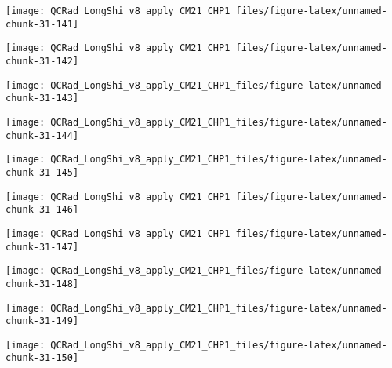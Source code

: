 \documentclass[
  10pt,
  a4paper,oneside]{article}
\begin{document}
\begin{center}\texttt{[image: QCRad\_LongShi\_v8\_apply\_CM21\_CHP1\_files/figure-latex/unnamed-chunk-31-141]} \end{center}

\begin{center}\texttt{[image: QCRad\_LongShi\_v8\_apply\_CM21\_CHP1\_files/figure-latex/unnamed-chunk-31-142]} \end{center}

\begin{center}\texttt{[image: QCRad\_LongShi\_v8\_apply\_CM21\_CHP1\_files/figure-latex/unnamed-chunk-31-143]} \end{center}

\begin{center}\texttt{[image: QCRad\_LongShi\_v8\_apply\_CM21\_CHP1\_files/figure-latex/unnamed-chunk-31-144]} \end{center}

\begin{center}\texttt{[image: QCRad\_LongShi\_v8\_apply\_CM21\_CHP1\_files/figure-latex/unnamed-chunk-31-145]} \end{center}

\begin{center}\texttt{[image: QCRad\_LongShi\_v8\_apply\_CM21\_CHP1\_files/figure-latex/unnamed-chunk-31-146]} \end{center}

\begin{center}\texttt{[image: QCRad\_LongShi\_v8\_apply\_CM21\_CHP1\_files/figure-latex/unnamed-chunk-31-147]} \end{center}

\begin{center}\texttt{[image: QCRad\_LongShi\_v8\_apply\_CM21\_CHP1\_files/figure-latex/unnamed-chunk-31-148]} \end{center}

\begin{center}\texttt{[image: QCRad\_LongShi\_v8\_apply\_CM21\_CHP1\_files/figure-latex/unnamed-chunk-31-149]} \end{center}

\begin{center}\texttt{[image: QCRad\_LongShi\_v8\_apply\_CM21\_CHP1\_files/figure-latex/unnamed-chunk-31-150]} \end{center}
\end{document}
